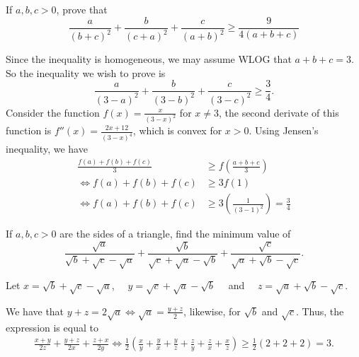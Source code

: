 \documentclass[12pt, paper=letter]{scrartcl}
\begin{document}
    \begin{problem-wos}
        If $a,b,c > 0$, prove that
        \[
            \frac{a}{(b + c)^2} + \frac{b}{(c + a)^2} + \frac{c}{(a + b)^2} \geq \frac{9}{4(a + b + c)}
        \]
    \end{problem-wos}
    \begin{solution}
        Since the inequality is homogeneous, we may assume WLOG that $a + b + c = 3$.
        So the inequality we wish to prove is
        \[
            \frac{a}{(3 - a)^2} + \frac{b}{(3 - b)^2} + \frac{c}{(3 - c)^2} \geq \frac{3}{4}.
        \]
        Consider the function $f(x) = \frac{x}{(3 - x)^2}$ for $x \neq 3$, the second derivate of this function is $f''(x) = \frac{2x + 12}{(3 - x)^4}$, which is convex for $x > 0$.
        Using Jensen's inequality, we have
        \begin{align*}
            \frac{f(a) + f(b) + f(c)}{3} &\geq f \left(\frac{a + b + c }{3}\right)\\[3mm]
            \iff f(a) + f(b) + f(c) &\geq 3 f(1)\\[3mm]
            \iff f(a) + f(b) + f(c) &\geq 3 \left(\frac{1}{(3 - 1)^2}\right) = \frac{3}{4}
        \end{align*}\qedhere
    \end{solution}

    \begin{problem-wos}
        If $a,b,c > 0$ are the sides of a triangle, find the minimum value of
        \[
            \frac{\sqrt {a}}{\sqrt {b} + \sqrt {c} - \sqrt {a}} + \frac{\sqrt {b}}{\sqrt {c} + \sqrt {a} - \sqrt {b}} + \frac{\sqrt {c}}{\sqrt {a} + \sqrt {b} - \sqrt {c}}.
        \]
    \end{problem-wos}
    \begin{solution}
        Let $x = \sqrt {b} + \sqrt {c} - \sqrt {a}$, $\quad y = \sqrt {c} + \sqrt {a} - \sqrt {b}\quad$ and $\quad z = \sqrt {a} + \sqrt {b} - \sqrt {c}$.

        We have that $y + z = 2 \sqrt {a} \iff \sqrt {a} = \frac{y + z}{2}$, likewise, for $\sqrt {b}$ and $\sqrt {c}$.
        Thus, the expression is equal to
        \begin{align*}
            \frac{x + y}{2z} + \frac{y + z}{2x} + \frac{z + x}{2y}
            \iff \frac{1}{2} \left(\frac{x}{y} + \frac{y}{x} + \frac{y}{z} + \frac{z}{y} + \frac{z}{x} + \frac{x}{z}\right)
            \geq \frac{1}{2} (2 + 2 + 2) = 3.
        \end{align*}
    \end{solution}
\end{document}
